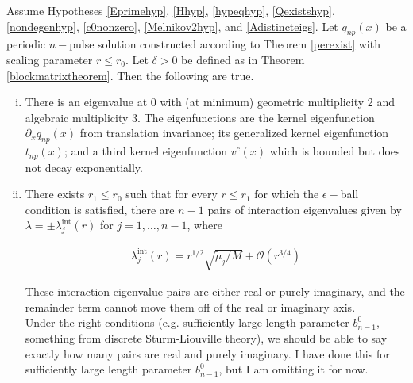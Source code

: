 \documentclass[thesis.tex]{subfiles}
\begin{document}
\begin{theorem}\label{locateeigtheorem}
Assume Hypotheses \ref{Eprimehyp}, \ref{Hhyp}, \ref{hypeqhyp}, \ref{Qexistshyp}, \ref{nondegenhyp}, \ref{c0nonzero}, \ref{Melnikov2hyp}, and \ref{Adistincteigs}. Let $q_{np}(x)$ be a periodic $n-$pulse solution constructed according to Theorem \ref{perexist} with scaling parameter $r \leq r_0$. Let $\delta > 0$ be defined as in Theorem \ref{blockmatrixtheorem}. Then the following are true.

\begin{enumerate}[(i)]

\item There is an eigenvalue at 0 with (at minimum) geometric multiplicity 2 and algebraic multiplicity 3. The eigenfunctions are the kernel eigenfunction $\partial_x q_{np}(x)$ from translation invariance; its generalized kernel eigenfunction $t_{np}(x)$; and a third kernel eigenfunction $v^c(x)$ which is bounded but does not decay exponentially.

\item There exists $r_1 \leq r_0$ such that for every $r \leq r_1$ for which the $\epsilon-$ball condition is satisfied, there are $n - 1$ pairs of interaction eigenvalues given by $\lambda = \pm \lambda^{\text{int}}_j(r)$ for $j = 1, \dots, n-1$, where

\begin{align*}
\lambda^{\text{int}}_j(r) = r^{1/2} \sqrt{\tilde{\mu}_j / M} + \mathcal{O}(r^{3/4})
\end{align*}

These interaction eigenvalue pairs are either real or purely imaginary, and the remainder term cannot move them off of the real or imaginary axis.\\

Under the right conditions (e.g. sufficiently large length parameter $b_{n-1}^0$, something from discrete Sturm-Liouville theory), we should be able to say exactly how many pairs are real and purely imaginary. I have done this for sufficiently large length parameter $b_{n-1}^0$, but I am omitting it for now.




\end{enumerate}
\end{theorem}
\end{document}
